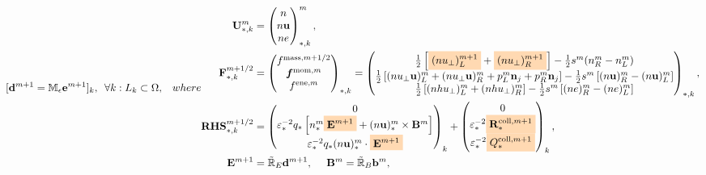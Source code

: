 \documentclass{article}
\newcommand{\mycolorbox}[2]{\colorbox{#1}{$\displaystyle#2$}}
\begin{document}
\begin{subequations}
\begin{align}
    [\mathbf{d}^{m+1} = \mathbb{M}_\epsilon\mathbf{e}^{m+1}]_k,\ \ &\forall k:L_k \subset \Omega \label{equ:material_law_d_ap},
\end{align}
where 
\begin{align}
    \mathbf{U}_{*,k}^{m} &=
    \begin{pmatrix}
    n \\
    n \mathbf{u} \\
    n e
    \end{pmatrix}^m_{\ast,k}, \\
    \mathbf{F}_{*,k}^{m+1/2} &=
    \begin{pmatrix}
    f^{\text{mass},m+1/2} \\
    \bm{f}^{\text{mom},m} \\
    f^{\text{ene},m}
    \end{pmatrix}_{\ast,k}
    = 
    \begin{pmatrix}
    \frac{1}{2}\left[\mycolorbox{orange!30}{(nu_{\bot})_{L}^{m+1}} + \mycolorbox{orange!30}{(nu_{\bot})_{R}^{m+1}}\right] - \frac{1}{2}s^m(n_{R}^m - n_{L}^m) \\
    \frac{1}{2}\left[(nu_{\bot}\mathbf{u})^m_{L} + (nu_{\bot}\mathbf{u})^m_{R} + p_{L}^m\mathbf{n}_j + p_{R}^m\mathbf{n}_j\right] - \frac{1}{2}s^m\left[(n\mathbf{u})^m_{R} - (n\mathbf{u})^m_{L}\right] \\
    \frac{1}{2}\left[(nhu_\bot)^m_{L} + (nhu_\bot)^m_{R}\right] - \frac{1}{2}s^m\left[(ne)^m_{R} - (ne)^m_{L}\right]
    \end{pmatrix}_{\ast,k}, \label{equ:flux_ap}\\
    \mathbf{RHS}_{*,k}^{m+1/2} &=
    \begin{pmatrix}
    0 \\
    \varepsilon_*^{-2}q_*\left[n_*^m\mycolorbox{orange!30}{\mathbf{E}^{m+1}} + (n\mathbf{u})^m_*\times\mathbf{B}^m\right] \\
    \varepsilon_*^{-2}q_*(n\mathbf{u})^m_* \cdot \mycolorbox{orange!30}{\mathbf{E}^{m+1}}
    \end{pmatrix}_k +
    \begin{pmatrix}
    0 \\
    \varepsilon_*^{-2}\mycolorbox{orange!30}{\mathbf{R}_{*}^{\text{coll},m+1}} \\
    \varepsilon_*^{-2}\mycolorbox{orange!30}{Q_*^{\text{coll}, m+1}} 
    \end{pmatrix}_k, \label{equ:rhs_ap}\\
    \mathbf{E}^{m+1} &= \Tilde{\mathbb{R}}_E\mathbf{d}^{m+1},
    \ \ \ \ 
    \mathbf{B}^{m} = \Tilde{\mathbb{R}}_B\mathbf{b}^{m}, \\

\end{align}
\end{subequations}
\end{document}

